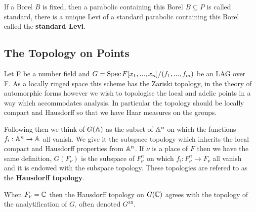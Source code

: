     If a Borel \(B\) is fixed, then a parabolic containing this Borel \(B\subseteq P\) is called standard, there is a unique Levi of a standard parabolic containing this Borel called the \textbf{standard Levi}.
    
    \subsection{The Topology on Points}
	Let F be a number field and \(G = \operatorname{Spec} F[x_1, ..., x_n]/(f_1, ..., f_m)\) be an LAG over F. As a locally ringed space this scheme has the Zariski topology, in the theory of automorphic forms however we wish to topologise the local and adelic points in a way which accommodates analysis. In particular the topology should be locally compact and Hausdorff so that we have Haar measures on the groups. 
	
	Following \cite{conradWeilGrothendieckApproaches2012} then we think of \(G(\A)\) as the subset of \(\A^n\) on which the functions \(f_i: \A^n \to \A\) all vanish. We give it the subspace topology which inherits the local compact and Hausdorff properties from \(\A^n\). If \(\nu\) is a place of \(F\) then we have the same definition, \(G(F_\nu)\) is the subspace of \(F_\nu^n\) on which \(f_i:F_\nu^n \to F_\nu\) all vanish and it is endowed with the subspace topology.
	These topologies are refered to as the \textbf{Hausdorff topology}.
	
	\begin{remark}
		When \(F_\nu = \C\) then the Hausdorff topology on \(G(\C)\) agrees with the topology of the analytification of \(G\), often denoted \(G^{\mathrm{an}}\).
	\end{remark}

